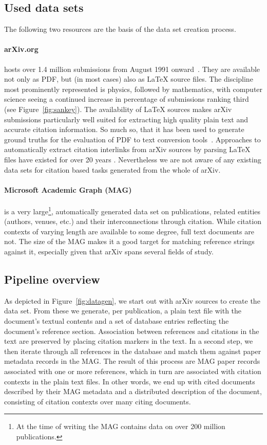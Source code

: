 \subsection{Used data sets}

The following two resources are the basis of the data set creation process.

\paragraph{arXiv.org} hosts over 1.4 million submissions from August 1991 onward~\cite{Ginsparg1994}. They are available not only as PDF, but (in most cases) also as \LaTeX{} source files. The discipline most prominently represented is physics, followed by mathematics, with computer science seeing a continued increase in percentage of submissions ranking third (see Figure~\ref{fig:sankey}). The availability of \LaTeX{} sources makes arXiv submissions particularly well suited for extracting high quality plain text and accurate citation information. So much so, that it has been used to generate ground truths for the evaluation of PDF to text conversion tools~\cite{Bast2017}. Approaches to automatically extract citation interlinks from arXiv sources by parsing \LaTeX{} files have existed for over 20 years \cite{Nanba1998}. Nevertheless we are not aware of any existing data sets for citation based tasks generated from the whole of arXiv.

\paragraph{Microsoft Academic Graph (MAG)} is a very large\footnote{At the time of writing the MAG contains data on over 200 million publications.}, automatically generated data set on publications, related entities (authors, venues, etc.) and their interconnections through citation. While citation contexts of varying length are available to some degree, full text documents are not. The size of the MAG makes it a good target for matching reference strings against it, especially given that arXiv spans several fields of study.

\subsection{Pipeline overview}

As depicted in Figure~\ref{fig:datagen}, we start out with arXiv sources to create the data set. From these we generate, per publication, a plain text file with the document's textual contents and a set of database entries reflecting the document's reference section. Association between references and citations in the text are preserved by placing citation markers in the text. In a second step, we then iterate through all references in the database and match them against paper metadata records in the MAG. The result of this process are MAG paper records associated with one or more references, which in turn are associated with citation contexts in the plain text files. In other words, we end up with cited documents described by their MAG metadata and a distributed description of the document, consisting of citation contexts over many citing documents.

